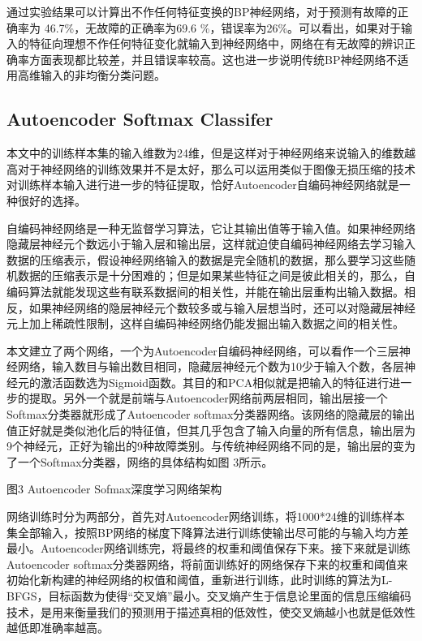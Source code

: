 \documentclass{ctacn}%
\begin{document}
\begin{multicols}{2}
通过实验结果可以计算出不作任何特征变换的BP神经网络，对于预测有故障的正确率为
46.7\%，无故障的正确率为69.6
\%，错误率为26\%。可以看出，如果对于输入的特征向理想不作任何特征变化就输入到神经网络中，网络在有无故障的辨识正确率方面表现都比较差，并且错误率较高。这也进一步说明传统BP神经网络不适用高维输入的非均衡分类问题。

\subsection{Autoencoder Softmax
Classifer}

本文中的训练样本集的输入维数为24维，但是这样对于神经网络来说输入的维数越高对于神经网络的训练效果并不是太好，那么可以运用类似于图像无损压缩的技术对训练样本输入进行进一步的特征提取，恰好Autoencoder自编码神经网络就是一种很好的选择。

自编码神经网络是一种无监督学习算法，它让其输出值等于输入值。如果神经网络隐藏层神经元个数远小于输入层和输出层，这样就迫使自编码神经网络去学习输入数据的压缩表示，假设神经网络输入的数据是完全随机的数据，那么要学习这些随机数据的压缩表示是十分困难的；但是如果某些特征之间是彼此相关的，那么，自编码算法就能发现这些有联系数据间的相关性，并能在输出层重构出输入数据。相反，如果神经网络的隐层神经元个数较多或与输入层想当时，还可以对隐藏层神经元上加上稀疏性限制，这样自编码神经网络仍能发掘出输入数据之间的相关性。

本文建立了两个网络，一个为Autoencoder自编码神经网络，可以看作一个三层神经网络，输入数目与输出数目相同，隐藏层神经元个数为10少于输入个数，各层神经元的激活函数选为Sigmoid函数。其目的和PCA相似就是把输入的特征进行进一步的提取。另外一个就是前端与Autoencoder网络前两层相同，输出层接一个Softmax分类器就形成了Autoencoder
softmax分类器网络。该网络的隐藏层的输出值正好就是类似池化后的特征值，但其几乎包含了输入向量的所有信息，输出层为9个神经元，正好为输出的9种故障类别。与传统神经网络不同的是，输出层的变为了一个Softmax分类器，网络的具体结构如图
3所示。

图3 Autoencoder Sofmax深度学习网络架构

网络训练时分为两部分，首先对Autoencoder网络训练，将1000*24维的训练样本集全部输入，按照BP网络的梯度下降算法进行训练使输出尽可能的与输入均方差最小。Autoencoder网络训练完，将最终的权重和阈值保存下来。接下来就是训练Autoencoder
softmax分类器网络，将前面训练好的网络保存下来的权重和阈值来初始化新构建的神经网络的权值和阈值，重新进行训练，此时训练的算法为L-BFGS，目标函数为使得``交叉熵''最小。交叉熵产生于信息论里面的信息压缩编码技术，是用来衡量我们的预测用于描述真相的低效性，使交叉熵越小也就是低效性越低即准确率越高。


\end{multicols}
\end{document}
